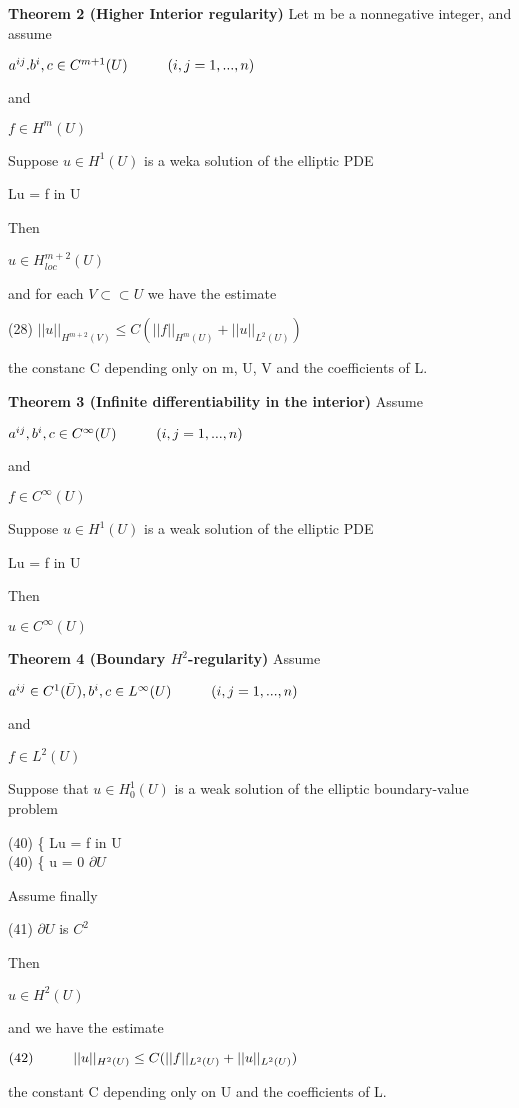 \documentclass{article}
\newcommand\tab[1][1cm]{\hspace*{#1}}
\begin{document}
\textbf {Theorem 2 (Higher Interior regularity)} Let m be a nonnegative integer, and assume 
\begin{center}
$a^{ij}. b^{i}, c \in C^{m+1}(U) \tab (i, j = 1,...,n)$
\end{center}
and 
\begin{center}
$ f \in H^{m}(U)$
\end{center}
Suppose $u \in H^1(U)$ is a weka solution of the elliptic PDE
\begin{center}
Lu = f \tab in U
\end{center}
Then 
\begin{center}
$u \in H_{loc}^{m+2}(U)$
\end{center}
and for each $V \subset \subset U$ we have the estimate
\begin{center}
(28) \tab $||u||_{H^{m+2}(V)} \leq C(||f||_{H^{m}(U)} + ||u||_{L^{2}(U)})$
\end{center}
the constanc C depending only on m, U, V and the coefficients of L.

\textbf {Theorem 3 (Infinite differentiability in the interior)} Assume 
\begin{center}
$a^{ij}, b^i, c \in C^{\infty} (U) \tab (i,j = 1,...,n)$
\end{center}
and 
\begin{center}
$f \in C^{\infty}(U)$
\end{center}
Suppose $u \in H^1(U)$ is a weak solution of the elliptic PDE
\begin{center}
Lu = f \tab in U
\end{center}
Then 
\begin{center}
$u \in C^{\infty}(U)$
\end{center}

\textbf {Theorem 4 (Boundary $H^2$-regularity)} Assume 
\begin{center}
$a^{ij} \in C^1(\bar{U}), b^i, c \in L^{\infty}(U) \tab (i,j =1,...,n)$
\end{center}
and 
\begin{center}
$f \in L^2(U)$
\end{center}
Suppose that $u \in H_0^1(U)$ is a weak solution of the elliptic boundary-value problem
\begin{center}
(40) \tab \{ Lu = f \tab in U \\
(40) \tab \{ u = 0 \tab $\partial U$
\end{center}
Assume finally
\begin{center}
(41) \tab $\partial U$ is $C^2$
\end{center}
Then
\begin{center}
$u \in H^2(U)$ 
\end{center}
and we have the estimate
\begin{center}
$(42) \tab ||u||_{H^{2}(U)} \leq C(||f||_{L^{2}(U)} + ||u||_{L^{2}(U)})$
\end{center}
the constant C depending only on U and the coefficients of L.
\end{document}

